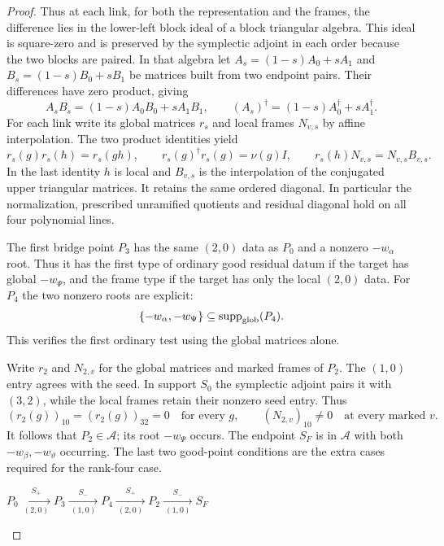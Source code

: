 \begin{proof}
Thus at each link, for both the
representation and the frames, the difference
lies in the lower-left block ideal of a block
triangular algebra. This ideal is square-zero
and is preserved by the symplectic adjoint in
each order because the two blocks are paired.
In that algebra let \(A_s=(1-s)A_0+sA_1\) and
\(B_s=(1-s)B_0+sB_1\) be matrices built from two endpoint
pairs. Their differences have zero product, giving
\[
 A_s B_s
      =(1-s)A_0B_0+sA_1B_1,
 \qquad
 (A_s)^\dagger=(1-s)A_0^\dagger+sA_1^\dagger .
\]
For each link write its global matrices \(r_s\) and local
frames \(N_{v,s}\) by affine interpolation. The two product
identities yield
\[
 r_s(g)r_s(h)=r_s(gh),\qquad
 r_s(g)^\dagger r_s(g)=\nu(g)I,\qquad
 r_s(h)N_{v,s}=N_{v,s}B_{v,s}.
\]
In the last identity \(h\) is local and \(B_{v,s}\) is the
interpolation of the conjugated upper triangular matrices.
It retains the same ordered diagonal. In particular the normalization, prescribed
unramified quotients and residual diagonal hold
on all four polynomial lines.

The first bridge point \(P_3\) has the same
\((2,0)\) data as \(P_0\) and a nonzero
\(-w_\alpha\) root. Thus it has the first type
of ordinary good residual datum if the target
has global \(-w_\Psi\), and the frame type if
the target has only the local \((2,0)\) data.
For \(P_4\) the two nonzero roots are explicit:
\[
 \{-w_\alpha,-w_\Psi\}\subseteq\operatorname{supp}_{\rm glob}(P_4).
\]
This verifies the first ordinary test using the global matrices alone.

Write \(r_2\) and \(N_{2,v}\) for the global matrices and marked frames of \(P_2\).
The \((1,0)\) entry agrees with the seed. In support \(S_0\) the symplectic adjoint pairs it with \((3,2)\), while the local frames retain their nonzero seed entry. Thus
\[
 (r_2(g))_{10}=(r_2(g))_{32}=0\quad\text{for every }g,
 \qquad (N_{2,v})_{10}\ne0\quad\text{at every marked }v.
\]
It follows that \(P_2\in\mathcal A\); its root \(-w_\Psi\) occurs. The endpoint
\(S_F\) is in \(\mathcal A\) with both
\(-w_\beta,-w_\vartheta\) occurring. The last
two good-point conditions are the extra cases
required for the rank-four case.
\label{cor:ordinary-count-iii-chain-1}

\begin{construction}
\(\displaystyle
P_0 \xrightarrow[\ (2,0)\ ]{S_+} P_3
    \xrightarrow[\ (1,0)\ ]{S_-} P_4
    \xrightarrow[\ (2,0)\ ]{S_+} P_2
    \xrightarrow[\ (1,0)\ ]{S_-} S_F
\)
\caption{The four affine residual lines. Above each arrow is the allowed global support on that line, below is the entry shared by the two endpoints in both the global and frame data. Fixing the paired diagonal blocks makes the interpolation multiplicative.}\label{fig:four-residual-line-supports}
\end{construction}


\end{proof}
